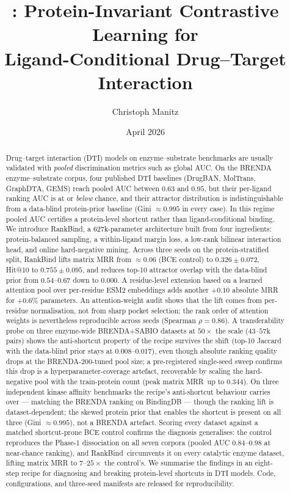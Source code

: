 \documentclass[11pt,a4paper]{article}
\title{\textbf{\method: Protein-Invariant Contrastive Learning for\\
Ligand-Conditional Drug--Target Interaction}}
\author[1]{Christoph Manitz}
\affil[1]{Leipzig University, Germany \\
\texttt{christoph.manitz@uni-leipzig.de}}
\date{April 2026}
\newcommand{\method}{RankBind\xspace}
\newcommand{\matmrr}{matrix MRR}
\begin{document}
\maketitle

\begin{abstract}
Drug--target interaction (DTI) models on enzyme--substrate benchmarks are
usually validated with \emph{pooled} discrimination metrics such as global
AUC. On the BRENDA enzyme--substrate corpus, four published DTI baselines
(DrugBAN, MolTrans, GraphDTA, GEMS) reach pooled AUC between $0.63$ and
$0.95$, but their per-ligand ranking AUC is at or \emph{below} chance,
and their attractor distribution is indistinguishable from a data-blind
protein-prior baseline (Gini $\approx 0.995$ in every case). In this
regime pooled AUC certifies a protein-level shortcut rather than
ligand-conditional binding. We introduce \method, a $627$k-parameter
architecture built from four ingredients: protein-balanced sampling,
a within-ligand margin loss, a low-rank bilinear interaction head,
and online hard-negative mining. Across three seeds on the
protein-stratified split, \method lifts matrix MRR from $\approx\!0.06$
(BCE control) to $0.326 \pm 0.072$, Hit@10 to $0.755 \pm 0.095$, and
reduces top-10 attractor overlap with the data-blind prior from
$0.54$--$0.67$ down to $0.000$. A residue-level extension based on a
learned attention pool over per-residue ESM2 embeddings adds another
$+0.10$ absolute MRR for $+0.6\%$ parameters. An attention-weight audit
shows that the lift comes from per-residue normalisation, not from sharp
pocket selection; the rank order of attention weights is nevertheless
reproducible across seeds (Spearman $\rho = 0.86$). A transferability
probe on three enzyme-wide BRENDA+SABIO datasets at $50\times$ the scale
($43$--$57$k pairs) shows the anti-shortcut property of the recipe
survives the shift (top-10 Jaccard with the data-blind prior stays at
$0.008$--$0.017$), even though absolute ranking quality drops at the
BRENDA-200-tuned pool size; a pre-registered single-seed sweep confirms
this drop is a hyperparameter-coverage artefact, recoverable by scaling
the hard-negative pool with the train-protein count (peak \matmrr\ up to
$0.344$). On three independent kinase affinity benchmarks the recipe's
anti-shortcut behaviour carries over --- matching the BRENDA ranking on
BindingDB --- though the ranking lift is dataset-dependent; the skewed
protein prior that enables the shortcut is present on all three
(Gini $\approx 0.995$), not a BRENDA artefact. Scoring every dataset
against a matched shortcut-prone BCE control confirms the diagnosis
generalises: the control reproduces the Phase-1 dissociation on all
seven corpora (pooled AUC $0.84$--$0.98$ at near-chance ranking), and
\method\ circumvents it on every catalytic enzyme dataset, lifting
matrix MRR to $7$--$25\times$ the control's. We summarise the findings in an
eight-step recipe for diagnosing and breaking protein-level shortcuts
in DTI models. Code, configurations, and three-seed manifests are
released for reproducibility.
\end{abstract}
\end{document}

